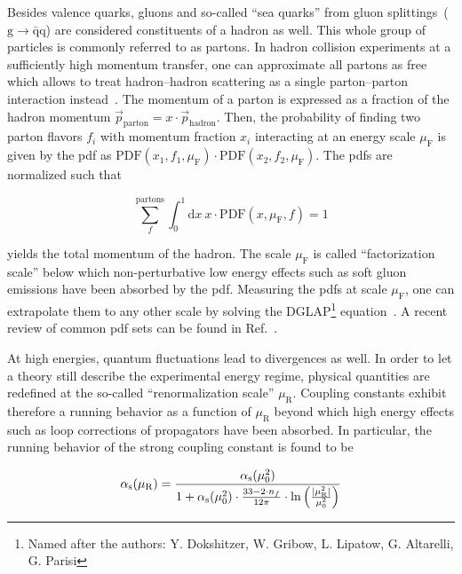 Besides valence quarks, gluons and so-called ``sea quarks'' from gluon splittings~($\mathrm{g}\to\bar{\mathrm{q}}\mathrm{q}$) are considered constituents of a hadron as well. This whole group of particles is commonly referred to as partons. In hadron collision experiments at a sufficiently high momentum transfer, one can approximate all partons as free which allows to treat hadron--hadron scattering as a single parton--parton interaction instead~\cite{Feynman:1969wa}. The momentum of a parton is expressed as a fraction of the hadron momentum $\vec{p}_\mathrm{parton}=x\cdot \vec{p}_\mathrm{hadron}$. Then, the probability of 
finding two parton flavors $f_{i}$ with momentum fraction $x_{i}$ interacting at an energy scale $\mu_\mathrm{F}$ is given by the \gls{pdf} as $\mathrm{PDF}(x_{1},f_{1},\mu_\mathrm{F})\cdot\mathrm{PDF}(x_{2},f_{2},\mu_\mathrm{F})$. The \glspl{pdf} are normalized such that

\begin{equation}
\sum_{f}^\mathrm{partons}\int_{0}^{1}\mathrm{d}x~x\cdot \mathrm{PDF}(x,\mu_\mathrm{F},f)=1
\end{equation}

yields the total momentum of the hadron. The scale $\mu_\mathrm{F}$ is called ``factorization scale'' below which non-perturbative low energy effects such as soft gluon emissions have been absorbed by the \gls{pdf}. Measuring the \glspl{pdf} at scale $\mu_\mathrm{F}$, one can extrapolate them to any other scale by solving the DGLAP\footnote{Named after the authors: Y. Dokshitzer, W. Gribow, L. Lipatow, G. Altarelli, G. Parisi} equation~\cite{Dokshitzer:1977sg,Gribov:1972ri,Altarelli:1977zs}. A recent review of common \gls{pdf} sets can be found in Ref.~\cite{Accardi2016}. 


At high energies, quantum fluctuations lead to divergences as well. In order to let a theory still describe the experimental energy regime, physical quantities are redefined at the so-called ``renormalization scale'' $\mu_\mathrm{R}$. Coupling constants exhibit therefore a running behavior as a function of $\mu_\mathrm{R}$ beyond which high energy effects such as loop corrections of propagators have been absorbed. In particular, the running behavior of the strong coupling constant is found to be 

\begin{equation}
{\alpha_\mathrm{s}}(\mu_\mathrm{R})=\frac{{\alpha_\mathrm{s}}(\mu_{0}^{2})}{1+{\alpha_\mathrm{s}}(\mu_\mathrm{0}^2)\cdot\tfrac{33-2\cdot n_f}{12\pi}\cdot\ln\Big(\tfrac{|\mu_\mathrm{R}^2|}{\mu_{0}^{2}}\Big)}
\end{equation}

